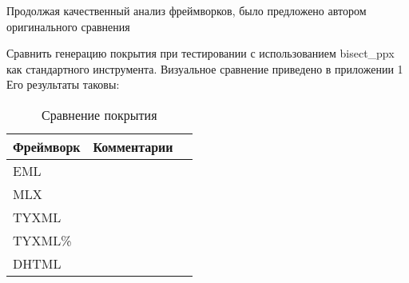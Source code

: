 

Продолжая качественный анализ фреймворков, было предложено автором оригинального сравнения %

Сравнить генерацию покрытия при тестировании с использованием bisect\_ppx как стандартного инструмента.
Визуальное сравнение приведено в приложении 1 %
Его результаты таковы:

\begin{table}[h]
    \centering
    \caption{Сравнение покрытия}
    \label{tab:coverage-comparison}
    \begin{tabular}{lp{3cm}p{3cm}}
        \toprule
        \textbf{Фреймворк} & \textbf{Комментарии} \\
        \midrule
        EML &  \\
        MLX &  \\
        TYXML &  \\
        TYXML\% &  \\
        DHTML &  \\
        \bottomrule
    \end{tabular}
\end{table}

